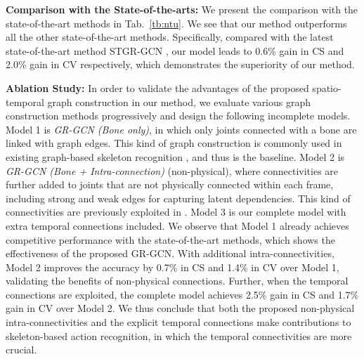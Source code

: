 \documentclass[conference]{IEEEtran}
\begin{document}
\textbf{Comparison with the State-of-the-arts:} We present the comparison with the state-of-the-art methods in Tab.~\ref{tb:ntu}. We see that our method outperforms all the other state-of-the-art methods. Specifically, compared with the latest state-of-the-art method STGR-GCN \cite{bi2019spatio}, our model leads to 0.6\% gain in CS and 2.0\% gain in CV respectively, which demonstrates the superiority of our method.



\textbf{Ablation Study:} In order to validate the advantages of the proposed spatio-temporal graph construction in our method, we evaluate various graph construction methods progressively and design the following incomplete models. Model 1 is \textit{GR-GCN (Bone only)}, in which only joints connected with a bone are linked with graph edges. This kind of graph construction is commonly used in existing graph-based skeleton recognition \cite{yan18,li18spatio,Tang_2018_CVPR}, and thus is the baseline. Model 2 is \textit{GR-GCN (Bone + Intra-connection)} (non-physical), where connectivities are further added to joints that are not physically connected within each frame, including strong and weak edges for capturing latent dependencies. This kind of connectivities are previously exploited in \cite{Tang_2018_CVPR}. Model 3 is our complete model with extra temporal connections included. We observe that Model 1 already achieves competitive performance with the state-of-the-art methods, which shows the effectiveness of the proposed GR-GCN. With additional intra-connectivities, Model 2 improves the accuracy by 0.7\% in CS and 1.4\% in CV over Model 1, validating the benefits of non-physical connections. Further, when the temporal connections are exploited, the complete model achieves 2.5\% gain in CS and 1.7\% gain in CV over Model 2. We thus conclude that both the proposed non-physical intra-connectivities and the explicit temporal connections make contributions to skeleton-based action recognition, in which the temporal connectivities are more crucial.
\end{document}
